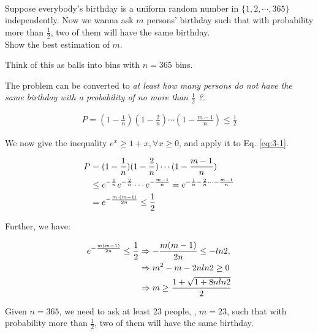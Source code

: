 ~\\

\begin{problem}
Suppose everybody's birthday is a uniform random number in $\{1, 2, \cdots, 365\}$ independently.
Now we wanna ask $m$ persons' birthday such that with probability more than $\frac{1}{2}$, two of them will have the same birthday. \\
\hspace*{.2in} Show the best estimation of $m$.

\begin{hint}
Think of this as balls into bins with $n = 365$ bins.
\end{hint}

\Answer

The problem can be converted to \textit{at least how many persons do not have the same birthday with a probability of no more than $\frac{1}{2}$ ?}.

\begin{align}\label{eq:3-1}
P= (1 - \frac{1}{n})(1 - \frac{2}{n}) \cdots (1 - \frac{m - 1}{n}) \le \frac{1}{2}
\end{align}

We now give the inequality $e^x \ge 1 + x, \forall x \ge 0$, and apply it to Eq. \eqref{eq:3-1}.

\begin{align}
    \notag P&= (1 - \frac{1}{n})(1 - \frac{2}{n}) \cdots (1 - \frac{m - 1}{n}) \\ 
    \notag & \le e^{-\frac{1}{n}}e^{-\frac{2}{n}} \cdots e^{-\frac{m-1}{n}}
    = e^{-\frac{1}{n}-\frac{2}{n} \cdots -\frac{m-1}{n}} \\ 
& = e^{-\frac{m \cdot (m-1)}{2n}} \le \frac{1}{2}
\end{align}

Further, we have:

\begin{align}
    \notag e^{-\frac{m(m-1)}{2n}} \le \frac{1}{2}  
    & \Rightarrow -\frac{m(m-1)}{2n} \le -ln2, \\  
    \notag &\Rightarrow m^2 - m - 2n ln 2 \ge 0 \\ 
&\Rightarrow m \ge \frac{1 + \sqrt{1 + 8n ln2}}{2}
\end{align}

Given $n = 365$, we need to ask at least 23 people, \ie, $m=23$, such that with probability more than $\frac{1}{2}$, two of them will have the same birthday.

\end{problem}

